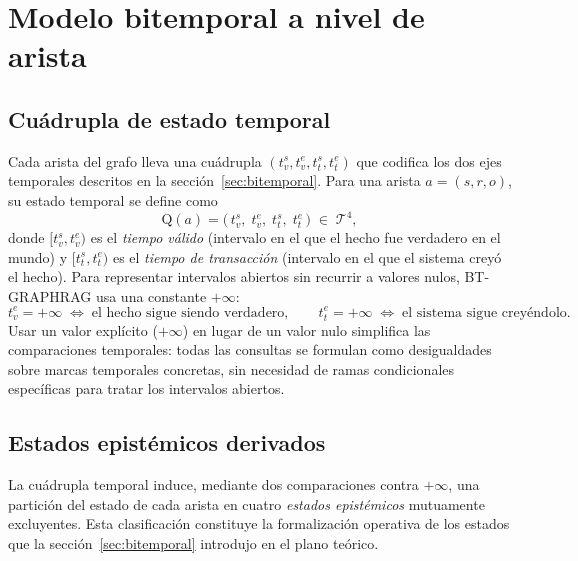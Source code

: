 \section{Modelo bitemporal a nivel de arista}\label{sec:bt-bitemporal}

\subsection{Cuádrupla de estado temporal}

Cada arista del grafo lleva una cuádrupla $(t_v^s, t_v^e, t_t^s, t_t^e)$ que codifica los dos ejes temporales descritos en la sección~\ref{sec:bitemporal}. Para una arista $a = (s, r, o)$, su estado temporal se define como
\begin{equation}
\mathrm{Q}(a) = \bigl(\,t_v^s,\; t_v^e,\; t_t^s,\; t_t^e\,\bigr) \;\in\; \mathcal{T}^4,
\end{equation}
donde $[t_v^s, t_v^e)$ es el \emph{tiempo válido} (intervalo en el que el hecho fue verdadero en el mundo) y $[t_t^s, t_t^e)$ es el \emph{tiempo de transacción} (intervalo en el que el sistema creyó el hecho). Para representar intervalos abiertos sin recurrir a valores nulos, BT-GRAPHRAG usa una constante $+\infty$:
\begin{equation}
t_v^e = +\infty \;\Longleftrightarrow\; \text{el hecho sigue siendo verdadero}, \qquad
t_t^e = +\infty \;\Longleftrightarrow\; \text{el sistema sigue creyéndolo}.
\end{equation}
Usar un valor explícito ($+\infty$) en lugar de un valor nulo simplifica las comparaciones temporales: todas las consultas se formulan como desigualdades sobre marcas temporales concretas, sin necesidad de ramas condicionales específicas para tratar los intervalos abiertos.

\subsection{Estados epistémicos derivados}

La cuádrupla temporal induce, mediante dos comparaciones contra $+\infty$, una partición del estado de cada arista en cuatro \emph{estados epistémicos} mutuamente excluyentes. Esta clasificación constituye la formalización operativa de los estados que la sección~\ref{sec:bitemporal} introdujo en el plano teórico.

